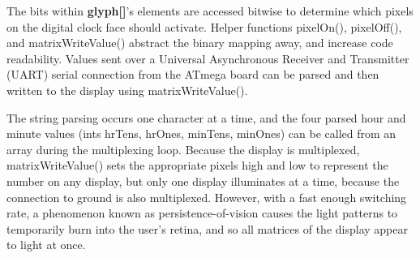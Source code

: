 \documentclass[11pt]{article}
\begin{document}
\begin{table}[H]
\centering
\caption{The table maps the physical placement of 26 pixels and 2 blanks to binary states on output pins.}
\label{tab:glyph-table-1}
\end{table}
The bits within \textbf{glyph[]}'s elements are accessed bitwise to determine which pixels on the digital clock face should activate. 
Helper functions pixelOn(), pixelOff(), and matrixWriteValue() abstract the binary mapping away, and increase code readability. 
Values sent over a Universal Asynchronous Receiver and Transmitter (UART) serial connection from the ATmega board can be parsed and then written to the display using matrixWriteValue(). 

The string parsing occurs one character at a time, and the four parsed hour and minute values (ints hrTens, hrOnes, minTens, minOnes) can be called from an array during the multiplexing loop. 
Because the display is multiplexed, matrixWriteValue() sets the appropriate pixels high and low to represent the number on any display, but only one display illuminates at a time, because the connection to ground is also multiplexed. 
However, with a fast enough switching rate, a phenomenon known as persistence-of-vision causes the light patterns to temporarily burn into the user's retina, and so all matrices of the display appear to light at once.



\begin{table}[h]
\centering
\caption{Here, the pin states, expressed as binary, are condensed and converted to hexadecimal.}
\label{tab:glyph-table-2}
\end{table}
\end{document}
